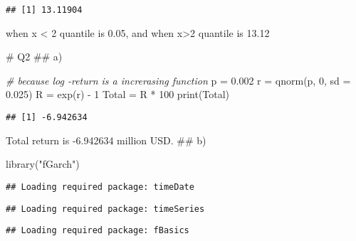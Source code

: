 \documentclass[
]{article}
\newenvironment{Shaded}{\begin{snugshade}}{\end{snugshade}}
\newcommand{\AttributeTok}[1]{\textcolor[rgb]{0.77,0.63,0.00}{#1}}
\newcommand{\CommentTok}[1]{\textcolor[rgb]{0.56,0.35,0.01}{\textit{#1}}}
\newcommand{\DecValTok}[1]{\textcolor[rgb]{0.00,0.00,0.81}{#1}}
\newcommand{\FloatTok}[1]{\textcolor[rgb]{0.00,0.00,0.81}{#1}}
\newcommand{\FunctionTok}[1]{\textcolor[rgb]{0.00,0.00,0.00}{#1}}
\newcommand{\NormalTok}[1]{#1}
\newcommand{\OtherTok}[1]{\textcolor[rgb]{0.56,0.35,0.01}{#1}}
\newcommand{\SpecialCharTok}[1]{\textcolor[rgb]{0.00,0.00,0.00}{#1}}
\newcommand{\StringTok}[1]{\textcolor[rgb]{0.31,0.60,0.02}{#1}}
\begin{document}
\begin{verbatim}
## [1] 13.11904
\end{verbatim}

when x \textless{} 2 quantile is 0.05, and when x\textgreater2 quantile
is 13.12

\# Q2 \#\# a)

\begin{Shaded}
\begin{Highlighting}[]
\CommentTok{\# because log {-}return is a increrasing function}
\NormalTok{p }\OtherTok{=} \FloatTok{0.002}
\NormalTok{r }\OtherTok{=} \FunctionTok{qnorm}\NormalTok{(p, }\DecValTok{0}\NormalTok{, }\AttributeTok{sd =} \FloatTok{0.025}\NormalTok{)}
\NormalTok{R }\OtherTok{=} \FunctionTok{exp}\NormalTok{(r) }\SpecialCharTok{{-}} \DecValTok{1}
\NormalTok{Total }\OtherTok{=}\NormalTok{ R }\SpecialCharTok{*} \DecValTok{100}
\FunctionTok{print}\NormalTok{(Total)}
\end{Highlighting}
\end{Shaded}

\begin{verbatim}
## [1] -6.942634
\end{verbatim}

Total return is -6.942634 million USD. \#\# b)

\begin{Shaded}
\begin{Highlighting}[]
\FunctionTok{library}\NormalTok{(}\StringTok{"fGarch"}\NormalTok{)}
\end{Highlighting}
\end{Shaded}

\begin{verbatim}
## Loading required package: timeDate
\end{verbatim}

\begin{verbatim}
## Loading required package: timeSeries
\end{verbatim}

\begin{verbatim}
## Loading required package: fBasics
\end{verbatim}
\end{document}
